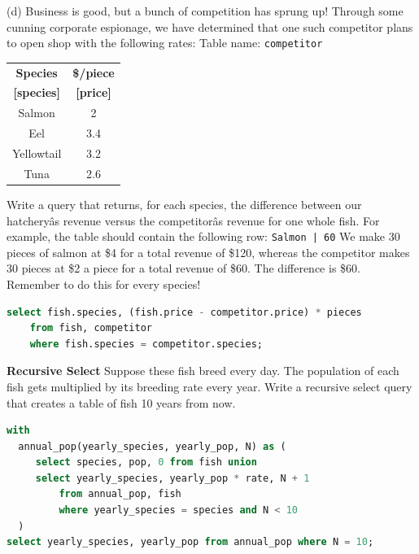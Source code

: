 \documentclass{exam}
\begin{document}
\begin{questions}
\begin{blocksection}
(d) Business is good, but a bunch of competition has sprung up! Through some cunning corporate espionage, we have determined that one such competitor plans to open shop with the following rates:\newline
\newline
Table name: \texttt{competitor}
\begin{center}
\begin{tabular}{ |c|c| }
 \hline
 \textbf{Species} & \textbf{\$/piece} \\
  \textbf{[species]} & \textbf{[price]} \\
 \hline
 Salmon & 2 \\
 \hline
 Eel & 3.4 \\
 \hline
  Yellowtail & 3.2  \\
 \hline
 Tuna & 2.6  \\
 \hline
\end{tabular}
\end{center}
Write a query that returns, for each species, the difference between our hatcheryâs revenue versus the competitorâs revenue for one whole fish. For example, the table should contain the following row: \newline
\texttt{Salmon | 60} \newline \newline
We make 30 pieces of salmon at \$4 for a total revenue of \$120, whereas the competitor makes 30 pieces at \$2 a piece for a total revenue of \$60. The difference is \$60. Remember to do this for every species!
\begin{solution}[1in]
\begin{lstlisting}[language=SQL]
select fish.species, (fish.price - competitor.price) * pieces
    from fish, competitor
    where fish.species = competitor.species;
\end{lstlisting}
\end{solution}


\end{blocksection}

\question \textbf{Recursive Select} Suppose these fish breed every day. The population of each fish gets multiplied by its breeding rate every year. Write a recursive select query that creates a table of fish 10 years from now.

\begin{solution}[0.5in]
\begin{lstlisting}[language=SQL]
with
  annual_pop(yearly_species, yearly_pop, N) as (
     select species, pop, 0 from fish union
     select yearly_species, yearly_pop * rate, N + 1
         from annual_pop, fish
         where yearly_species = species and N < 10
  )
select yearly_species, yearly_pop from annual_pop where N = 10;

\end{lstlisting}
\end{solution}


\end{questions}
\end{document}
